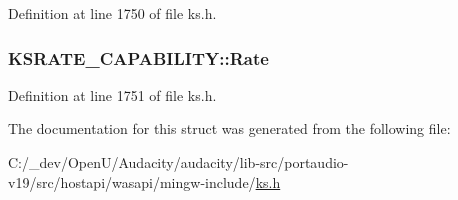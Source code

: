 Definition at line 1750 of file ks.\+h.

\subsubsection[{\texorpdfstring{Rate}{Rate}}]{ K\+S\+R\+A\+T\+E\+\_\+\+C\+A\+P\+A\+B\+I\+L\+I\+T\+Y\+::\+Rate}\hypertarget{struct_k_s_r_a_t_e___c_a_p_a_b_i_l_i_t_y_a12e47c0b7751655cd43433b0d595521a}{}\label{struct_k_s_r_a_t_e___c_a_p_a_b_i_l_i_t_y_a12e47c0b7751655cd43433b0d595521a}


Definition at line 1751 of file ks.\+h.



The documentation for this struct was generated from the following file\+:\begin{DoxyCompactItemize}
\item 
C\+:/\+\_\+dev/\+Open\+U/\+Audacity/audacity/lib-\/src/portaudio-\/v19/src/hostapi/wasapi/mingw-\/include/\hyperlink{ks_8h}{ks.\+h}\end{DoxyCompactItemize}
